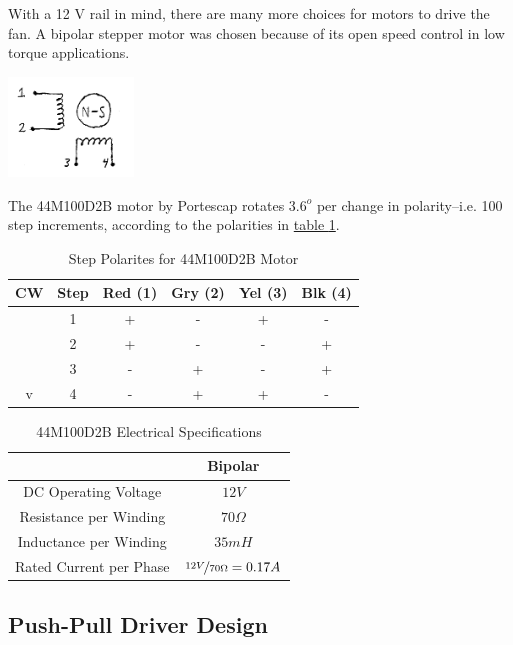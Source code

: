 \documentclass[10pt, twocolumn]{article}
\begin{document}
With a 12 V rail in mind, there are many more choices for motors to drive the fan.
A bipolar stepper motor was chosen because of its open speed control in low torque applications.

\begin{center}
	\includegraphics[width=0.25\textwidth]{Figures/bipolar-motor.pdf}
\end{center}

The 44M100D2B motor by Portescap rotates $3.6^{o}$ per change in polarity--i.e. 100 step increments,
according to the polarities in
\hyperref[44M100D2B-polarities]{table \ref{44M100D2B-polarities}}.

\begin{table}
\centering
\caption{Step Polarites for 44M100D2B Motor}
\begin{tabular}{c | c | c | c | c | c}
\hline\hline
CW	&Step	&Red (1)&Gry (2)&Yel (3)&Blk (4)	\\
\hline\hline
\verb1|1	&1	&+	&-	&+	&-	\\
\verb1|1	&2	&+	&-	&-	&+	\\
\verb1|1	&3	&-	&+	&-	&+	\\
v		&4	&-	&+	&+	&-	\\
\hline\hline
\end{tabular}
\label{44M100D2B-polarities}
\end{table}

\begin{table}
\centering
\caption{44M100D2B Electrical Specifications}
\begin{tabular}{c | c }
\hline\hline
&Bipolar	\\
\hline\hline
DC Operating Voltage	&$12V$	\\
Resistance per Winding	&$70\Omega$	\\
Inductance per Winding	&$35mH$	\\
Rated Current per Phase	&$\nicefrac{12V}{70\Omega}=0.17A$	\\
\hline\hline
\end{tabular}
\end{table}

\subsection{Push-Pull Driver Design}
\end{document}
